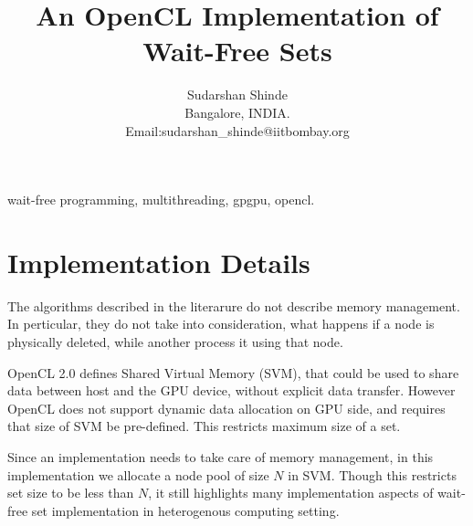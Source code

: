 \documentclass[11pt,onecolumn]{IEEEtran}
\begin{document}
\title{An OpenCL Implementation of Wait-Free Sets}

\author{Sudarshan Shinde \\
        Bangalore, INDIA. \\
Email:sudarshan\_shinde@iitbombay.org}

\maketitle




\begin{abstract}

\end{abstract}

\begin{IEEEkeywords}
wait-free programming, multithreading, gpgpu, opencl.
\end{IEEEkeywords}


\pagebreak

\section{Implementation Details}

The algorithms described in the literarure do not describe memory management. In perticular, they do not take into consideration, what happens if a node is physically deleted, while another process it using that node.

OpenCL 2.0 defines Shared Virtual Memory (SVM), that could be used to share data between host and the GPU device, without explicit data transfer. However OpenCL does not support dynamic data allocation on GPU side, and requires that size of SVM be pre-defined. This restricts maximum size of a set.

Since an implementation needs to take care of memory management, in this implementation we allocate a node pool of size $N$ in SVM. Though this restricts set size to be less than $N$, it still highlights many implementation aspects of wait-free set implementation in heterogenous computing setting.  
\end{document}
